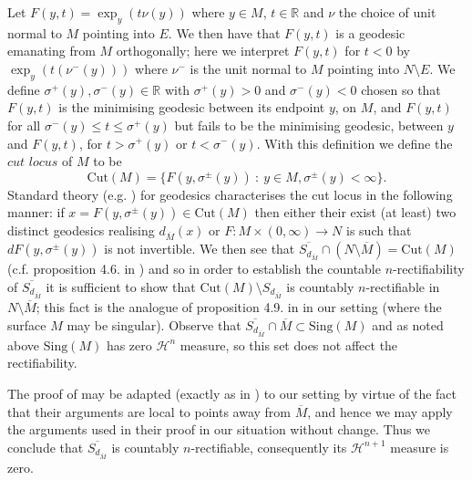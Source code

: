 \documentclass[11pt]{article}
\begin{document}
Let $F(y, t) = \exp_y(t \nu(y))$ where $y \in M$, $t \in \mathbb{R}$ and $\nu$ the choice of unit normal to $M$ pointing into $E$. We then have that $F(y,t)$ is a geodesic emanating from $M$ orthogonally; here we interpret $F(y,t)$ for $t < 0$ by $\exp_y(t(\nu^-(y)))$ where $\nu^-$ is the unit normal to $M$ pointing into $N \setminus E$. We define $\sigma^+(y), \sigma^-(y) \in \mathbb{R}$ with $\sigma^+(y) > 0$ and $\sigma^-(y) < 0$ chosen so that $F(y,t)$ is the minimising geodesic between its endpoint $y$, on $M$, and $F(y,t)$ for all $\sigma^-(y) \leq t \leq \sigma^+(y)$ but fails to be the minimising geodesic, between $y$ and $F(y,t)$, for $t > \sigma^+(y)$ or $t < \sigma^-(y)$. With this definition we define the $\textit{cut locus}$ of $M$ to be 
\begin{equation}\label{eqn: cut locus of M}
    \mathrm{Cut}(M) = \{ F(y,\sigma^\pm(y)) \: : \: y \in M, \sigma^\pm(y) < \infty \}.
\end{equation}
Standard theory (e.g. \cite{sakai}) for geodesics characterises the cut locus in the following manner: if $x = F(y,\sigma^\pm(y)) \in \mathrm{Cut}(M)$ then either their exist (at least) two distinct geodesics realising $d_{\overline{M}}(x)$ or $F : M \times (0,\infty) \rightarrow N$ is such that $dF(y,\sigma^\pm (y))$ is not invertible. We then see that $\overline{S_{d_{\overline{M}}}} \cap (N \setminus \overline{M}) = \mathrm{Cut}(M)$ (c.f. proposition 4.6. in \cite{mantegazza-mennucci}) and so in order to establish the countable $n$-rectifiability of $\overline{S_{d_{\overline{M}}}}$ it is sufficient to show that $\mathrm{Cut}(M) \setminus S_{d_{\overline{M}}}$ is countably $n$-rectifiable in $N \setminus \overline{M}$; this fact is the analogue of proposition 4.9. in \cite{mantegazza-mennucci} in our setting (where the surface $M$ may be singular). Observe that $\overline{S_{d_{\overline{M}}}} \cap \overline{M} \subset \mathrm{Sing}(M)$ and as noted above $\mathrm{Sing}(M)$ has zero $\mathcal{H}^n$ measure, so this set does not affect the rectifiability. 

\bigskip

The proof of \cite[Proposition 4.9.]{mantegazza-mennucci} may be adapted (exactly as in \cite[Section 3]{bellettini}) to our setting by virtue of the fact that their arguments are local to points away from $\overline{M}$, and hence we may apply the arguments used in their proof in our situation without change. Thus we conclude that $\overline{S_{d_{\overline{M}}}}$ is countably $n$-rectifiable, consequently its $\mathcal{H}^{n+1}$ measure is zero. 
\end{document}
